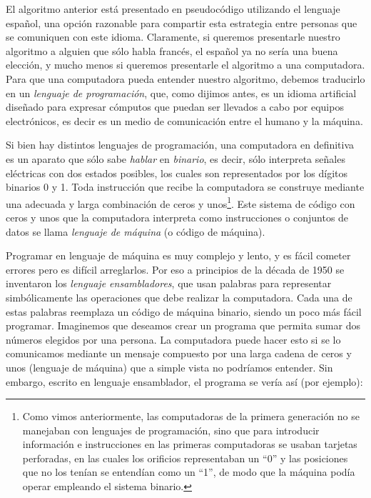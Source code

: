 \documentclass[
]{book}
\begin{document}
El algoritmo anterior está presentado en pseudocódigo utilizando el lenguaje español, una opción razonable para compartir esta estrategia entre personas que se comuniquen con este idioma. Claramente, si queremos presentarle nuestro algoritmo a alguien que sólo habla francés, el español ya no sería una buena elección, y mucho menos si queremos presentarle el algoritmo a una computadora. Para que una computadora pueda entender nuestro algoritmo, debemos traducirlo en un \emph{lenguaje de programación}, que, como dijimos antes, es un idioma artificial diseñado para expresar cómputos que puedan ser llevados a cabo por equipos electrónicos, es decir es un medio de comunicación entre el humano y la máquina.

Si bien hay distintos lenguajes de programación, una computadora en definitiva es un aparato que sólo sabe \emph{hablar} en \emph{binario}, es decir, sólo interpreta señales eléctricas con dos estados posibles, los cuales son representados por los dígitos binarios 0 y 1. Toda instrucción que recibe la computadora se construye mediante una adecuada y larga combinación de ceros y unos\footnote{Como vimos anteriormente, las computadoras de la primera generación no se manejaban con lenguajes de programación, sino que para introducir información e instrucciones en las primeras computadoras se usaban tarjetas perforadas, en las cuales los orificios representaban un ``0'' y las posiciones que no los tenían se entendían como un ``1'', de modo que la máquina podía operar empleando el sistema binario.}. Este sistema de código con ceros y unos que la computadora interpreta como instrucciones o conjuntos de datos se llama \emph{lenguaje de máquina} (o código de máquina).

Programar en lenguaje de máquina es muy complejo y lento, y es fácil cometer errores pero es difícil arreglarlos. Por eso a principios de la década de 1950 se inventaron los \emph{lenguaje ensambladores}, que usan palabras para representar simbólicamente las operaciones que debe realizar la computadora. Cada una de estas palabras reemplaza un código de máquina binario, siendo un poco más fácil programar. Imaginemos que deseamos crear un programa que permita sumar dos números elegidos por una persona. La computadora puede hacer esto si se lo comunicamos mediante un mensaje compuesto por una larga cadena de ceros y unos (lenguaje de máquina) que a simple vista no podríamos entender. Sin embargo, escrito en lenguaje ensamblador, el programa se vería así (por ejemplo):
\end{document}
